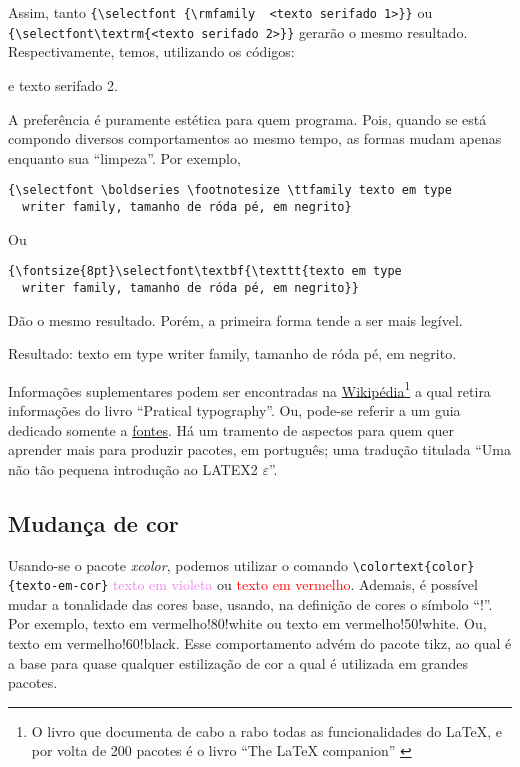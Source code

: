 \documentclass[12pt,
brazilian,
a5paper]{abntex2} %
\begin{document}
  Assim, tanto \verb+{\selectfont {\rmfamily  <texto serifado 1>}}+ ou \\
  \verb+{\selectfont\textrm{<texto serifado 2>}}+ gerarão o mesmo
  resultado. Respectivamente, temos, utilizando os códigos: {{\selectfont {\rmfamily  texto
        serifado 1}} e {\selectfont \textrm{texto serifado 2}}.

    A preferência é puramente estética para quem programa. Pois, quando
    se está compondo diversos comportamentos ao mesmo tempo, as formas
    mudam apenas enquanto sua ``limpeza''. Por exemplo,
\begin{verbatim}{\selectfont \boldseries \footnotesize \ttfamily texto em type
  writer family, tamanho de róda pé, em negrito}
\end{verbatim}
    Ou
\begin{verbatim}{\fontsize{8pt}\selectfont\textbf{\texttt{texto em type
  writer family, tamanho de róda pé, em negrito}}
\end{verbatim}
    Dão o mesmo resultado. Porém, a primeira forma tende a ser mais
    legível.

    \vspace{0.1cm}
    \noident Resultado: {{{{{{\selectfont \boldseries \footnotesize \ttfamily texto em type
                writer family, tamanho de róda pé, em negrito.}}}}}}

    Informações suplementares podem ser encontradas na
    \href{https://en.wikibooks.org/wiki/LaTeX/Fonts}{Wikipédia}\footnote{O
      livro que documenta de cabo a rabo todas as funcionalidades do \LaTeX,
      e por volta de 200 pacotes é o livro ``The \LaTeX{} companion''
      \cite{mittelbach2004}} a qual retira informações do livro ``Pratical typography''\cite{butterick2010}. Ou, pode-se referir a um guia dedicado somente
    a
    \href{https://www.latex-project.org/help/documentation/fntguide.pdf}{fontes}. Há
    um tramento de aspectos para quem quer aprender mais para produzir
    pacotes, em português; uma tradução titulada ``Uma não tão pequena
    introdução ao LATEX2 $\varepsilon$''\cite{oetiker1995}.

    \subsection{Mudança de cor \label{sc1:cor}}

    Usando-se o pacote \textit{xcolor}, podemos utilizar o comando \verb+\colortext{color}{texto-em-cor}+
    \textcolor{violet}{texto em violeta} ou \textcolor{red}{texto em
      vermelho}. Ademais, é possível mudar a tonalidade das cores base,
    usando, na definição de cores o símbolo ``!''. Por exemplo, \textcolor{red!80!white}{texto em vermelho!80!white} ou \textcolor{red!50!white}{texto em
      vermelho!50!white}. Ou, \textcolor{red!60!black}{texto em
      vermelho!60!black}. Esse comportamento advém do pacote tikz, ao qual
    é a base para quase qualquer estilização de cor a qual é utilizada em
    grandes pacotes.

}
\end{document}
